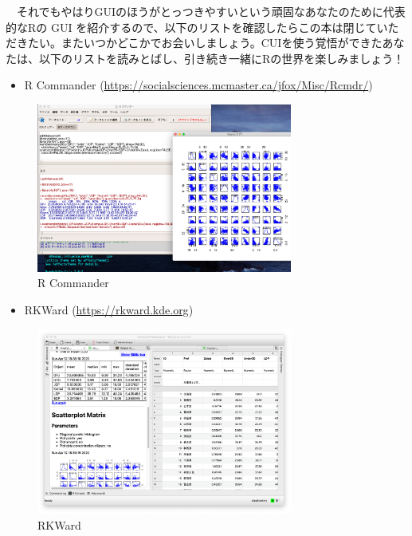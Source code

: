 \documentclass[
  a4paper,
  pandoc,
  ja=standard,
  jafont=haranoaji]{bxjsbook}
\providecommand{\tightlist}{%
  \setlength{\itemsep}{0pt}\setlength{\parskip}{0pt}}
\begin{document}
　それでもやはりGUIのほうがとっつきやすいという頑固なあなたのために代表的なRの
GUI
を紹介するので、以下のリストを確認したらこの本は閉じていただきたい。またいつかどこかでお会いしましょう。CUIを使う覚悟ができたあなたは、以下のリストを読みとばし、引き続き一緒にRの世界を楽しみましょう！

\begin{itemize}
\tightlist
\item
  R Commander
  (\url{https://socialsciences.mcmaster.ca/jfox/Misc/Rcmdr/})
\end{itemize}

\begin{figure}

{\centering \includegraphics[width=0.75\textwidth,height=\textheight]{./Figs/AboutR/GUI_Rcmdr.png}

}

\caption{\label{fig-aboutr_rcommander}R Commander}

\end{figure}

\begin{itemize}
\tightlist
\item
  RKWard (\url{https://rkward.kde.org})
\end{itemize}

\begin{figure}

{\centering \includegraphics[width=0.75\textwidth,height=\textheight]{./Figs/AboutR/GUI_RKWard.png}

}

\caption{\label{fig-aboutr_rkward}RKWard}

\end{figure}
\end{document}
